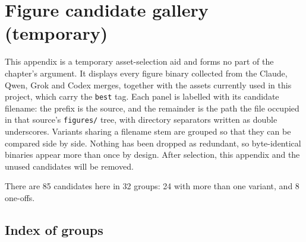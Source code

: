 
\clearpage
\renewcommand{\thesection}{\thechapter.\Alph{section}}
\section{Figure candidate gallery (temporary)}
\label{m:app:figuregallery}

This appendix is a temporary asset-selection aid and forms no part of the
chapter's argument. It displays every figure binary collected from the Claude,
Qwen, Grok and Codex merges, together with the assets currently used in this
project, which carry the \texttt{best} tag. Each panel is labelled with its
candidate filename: the prefix is the source, and the remainder is the path the
file occupied in that source's \texttt{figures/} tree, with directory
separators written as double underscores. Variants sharing a filename stem are
grouped so that they can be compared side by side. Nothing has been dropped as
redundant, so byte-identical binaries appear more than once by design. After
selection, this appendix and the unused candidates will be removed.

There are 85 candidates here in 32 groups: 24
with more than one variant, and 8 one-offs.

\subsection*{Index of groups}

